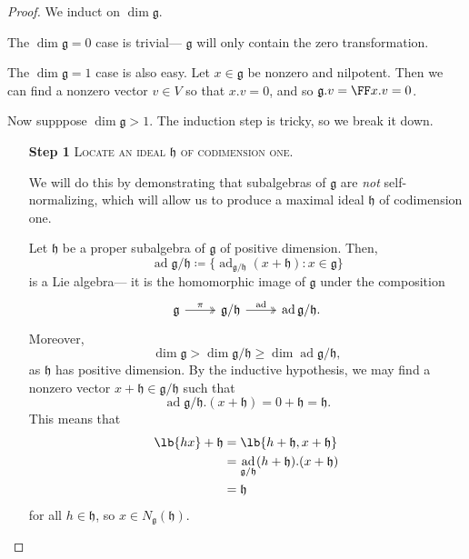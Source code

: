 \documentclass{article}
\DeclarePairedDelimiter\lb\lbrack\rbrack
\DeclareMathOperator{\ad}{ad}
\newcommand*\frkg{{\ensuremath{\mathfrak{g}}}}
\newcommand*\frkh{{\ensuremath{\mathfrak{h}}}}
\newcommand*\acts{.}
\begin{document}
\begin{proof}
    We induct on $\dim \frkg$.

    The $\dim \frkg = 0$ case is trivial--- $\frkg$ will only contain the zero transformation.

    The $\dim \frkg = 1$ case is also easy.
    Let $x \in \frkg$ be nonzero and nilpotent.
    Then  we can find a nonzero vector $v \in V$ so that $x \acts v = 0$, and so $\frkg \acts v = \FF x \acts v = 0$.

    Now supppose $\dim \frkg > 1$.
    The induction step is tricky, so we break it down.
    \begin{itemize}
        \item[\textbf{Step 1}] 
            \textsc{\color{Crimson} Locate an ideal $\frkh$ of codimension one.}

            We will do this by demonstrating that subalgebras of $\frkg$ are \textit{not} self-normalizing, which will allow us to produce a maximal ideal $\frkh$ of codimension one.

            Let $\frkh$ be a proper subalgebra of $\frkg$ of positive dimension.
            Then,
            \[
                \ad \frkg/\frkh
                \coloneq
                \Big\{
                    \ad_{\frkg/\frkh}(x + \frkh)
                    :
                    x \in \frkg
                \Big\}
            \]
            is a Lie algebra--- it is the homomorphic image of $\frkg$ under the composition
            \[
                \begin{tikzcd}
                    \frkg \arrow[r, "\pi", two heads] & \frkg/\frkh \arrow[r, "\ad", two heads] & \ad \frkg/\frkh. 
                \end{tikzcd}
            \]
            Moreover, 
            \[
                \dim \frkg > \dim \frkg/\frkh \geq \dim \ad \frkg/\frkh,
            \]
            as $\frkh$ has positive dimension.
            By the inductive hypothesis, we may find a nonzero vector $x + \frkh \in \frkg/\frkh$ such that
            \[
                \ad \frkg/\frkh \acts (x + \frkh) 
                = 
                0 + \frkh = \frkh.
            \]
            This means that
            \begin{align*}
                \lb{hx} + \frkh
                &=
                \lb{h + \frkh, x + \frkh}
                \\
                &=
                \ad_{\frkg/\frkh} (h + \frkh) \acts (x + \frkh) 
                \\
                &= 
                \frkh
            \end{align*}
            for all $h \in \frkh$, so $x \in N_\frkg(\frkh)$.


\end{itemize}
\end{proof}
\end{document}
